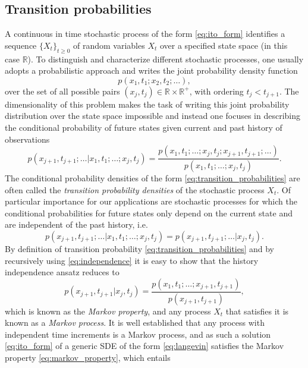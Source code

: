 \subsection{Transition probabilities}\label{subsec:transition_probabilities}
A continuous in time stochastic process of the form \eqref{eq:ito_form} identifies a sequence $\{X_t\}_{t\geq0}$ of random variables $X_t$ over a specified state space (in this case $\mathbb{R}$).
To distinguish and characterize different stochastic processes, one usually adopts a probabilistic approach and writes the joint probability density function
%
\begin{equation*}
  p(x_1,t_1;x_2,t_2;\dots),
\end{equation*}
%
over the set of all possible pairs $(x_j,t_j)\in \mathbb{R}\times\mathbb{R}^+$, with ordering $t_j<t_{j+1}$.
The dimensionality of this problem makes the task of writing this joint probability distribution over the state space impossible and instead one focuses in describing the conditional probability of future states given current and past history of observations
%
\begin{equation}\label{eq:transition_probabilities}
  p(x_{j+1},t_{j+1};\dots | x_1,t_1;\dots;x_j,t_j) = \frac{p(x_1,t_1;\dots;x_j,t_j;x_{j+1},t_{j+1};\dots)}{p(x_1,t_1;\dots;x_j,t_j)}.
\end{equation}
%
The conditional probability densities of the form \eqref{eq:transition_probabilities} are often called the \emph{transition probability densities} of the stochastic process $X_t$.
Of particular importance for our applications are stochastic processes for which the conditional probabilities for future states only depend on the current state and are independent of the past history, i.e.
%
\begin{equation}\label{eq:independence}
  p(x_{j+1},t_{j+1};\dots | x_1,t_1;\dots;x_j,t_j) = p(x_{j+1},t_{j+1};\dots | x_j,t_j).
\end{equation}
%
By definition of transition probability \eqref{eq:transition_probabilities} and by recursively using \eqref{eq:independence} it is easy to show that the history independence ansatz reduces to
%
\begin{equation}\label{eq:markov_property}
  p(x_{j+1},t_{j+1} | x_j,t_j) = \frac{p(x_1,t_1;\dots;x_{j+1},t_{j+1})}{p(x_{j+1},t_{j+1})},
\end{equation}
%
which is known as the \emph{Markov property}, and any process $X_t$ that satisfies it is known as a \emph{Markov process}.
It is well established that any process with independent time increments is a Markov process, and as such a solution \eqref{eq:ito_form} of a generic SDE of the form \eqref{eq:langevin} satisfies the Markov property \eqref{eq:markov_property}, which entails
